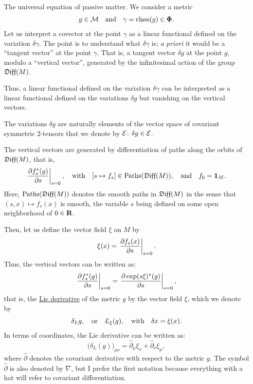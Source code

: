 \begin{Article}{The universal equation of passive matter.}{}
  We consider a metric
  $$
    g \in \mathcal{M}
    \quad \text{and} \quad
    \gamma = \operatorname{class}(g) \in {\mbox{\boldmath $\Phi$}}.
  $$
  Let us interpret a covector at the point $\gamma$ as a linear functional defined on the variation $\delta\gamma$.
  The point is to understand what $\delta\gamma$ is;
  {\em a priori} it would be a ``tangent vector'' at the point $\gamma$.
  That is,
  a tangent vector $\delta g$ at the point $g$,
  modulo a ``vertical vector'',
  generated by the infinitesimal action of the group $\mathfrak{Diff}(M)$.
  
  Thus,
  a linear functional defined on the variation $\delta\gamma$ can be interpreted as a linear functional
  defined on the variations $\delta g$ but vanishing on the vertical vectors.
  
  The variations $\delta g$ are naturally elements of the vector space of covariant symmetric $2$-tensors that we denote by $\mathcal{E}$:
  $\delta g \in \mathcal{E}$.
  
  The vertical vectors are generated by differentiation of paths along the orbits of $\mathfrak{Diff}(M)$,
  that is,
  $$
    \left.{\partial f_s^*(g) \over \partial s}\right|_{s=0},
    \quad \text{with} \quad
    [s \mapsto f_s] \in \operatorname{Paths}(\mathfrak{Diff}(M)),
    \quad \text{and} \quad
    f_0 = {\mathbf{1}}_M.
  $$
  Here,
  $\operatorname{Paths}(\mathfrak{Diff}(M))$ denotes the smooth paths in $\mathfrak{Diff}(M)$ in the sense that $(s,x) \mapsto f_s(x)$ is smooth,
  the variable $s$ being defined on some open neighborhood of $0 \in \mathbf{R}$.
  
  Then,
  let us define the vector field $\xi$ on $M$ by
  $$
    \xi(x) = \left.{\partial f_s(x) \over \partial s}\right|_{s=0}.
  $$
  Thus,
  the vertical vectors can be written as:
  $$
    \left.{\partial f_s^*(g) \over \partial s}\right|_{s=0} = \left.{\partial \exp(s\xi)^*(g) \over \partial s}\right|_{s=0},
  $$
  that is,
  the \uline{Lie derivative} of the metric $g$ by the vector field $\xi$,
  which we denote by
  $$
    \delta_L g,
    \quad \text{or} \quad \DLie_\xi(g),
    \quad \text{with} \quad
    \delta x = \xi(x).
  $$
  In terms of coordinates,
  the Lie derivative can be written as:
  $$
    \big(\delta_L(g)\big)_{\mu\nu} = \hat\partial_\mu \xi_\nu + \hat\partial_\nu \xi_\mu,
  $$
  where $\hat\partial$ denotes the covariant derivative with respect to the metric $g$.
  The symbol $\hat\partial$ is also denoted by $\nabla$,
  but I prefer the first notation because everything with a hat will refer to covariant differentiation.
  

\end{Article}
